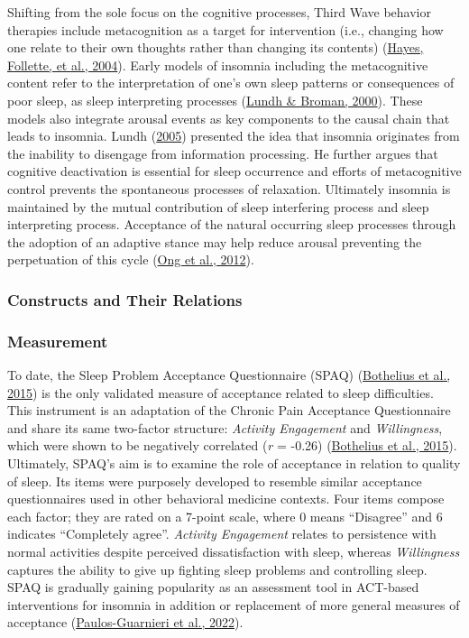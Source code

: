 \documentclass[
  ,doc,11pt, twoside,floatsintext]{apa6}
\begin{document}
Shifting from the sole focus on the cognitive processes, Third Wave behavior therapies include metacognition as a target for intervention (i.e., changing how one relate to their own thoughts rather than changing its contents) (\protect\hyperlink{ref-hayes2004mindfulness}{Hayes, Follette, et al., 2004}). Early models of insomnia including the metacognitive content refer to the interpretation of one's own sleep patterns or consequences of poor sleep, as sleep interpreting processes (\protect\hyperlink{ref-lundh2000}{Lundh \& Broman, 2000}). These models also integrate arousal events as key components to the causal chain that leads to insomnia. Lundh (\protect\hyperlink{ref-lundh2005}{2005}) presented the idea that insomnia originates from the inability to disengage from information processing. He further argues that cognitive deactivation is essential for sleep occurrence and efforts of metacognitive control prevents the spontaneous processes of relaxation. Ultimately insomnia is maintained by the mutual contribution of sleep interfering process and sleep interpreting process. Acceptance of the natural occurring sleep processes through the adoption of an adaptive stance may help reduce arousal preventing the perpetuation of this cycle (\protect\hyperlink{ref-ong2012}{Ong et al., 2012}).

\hypertarget{constructs-and-their-relations-1}{%
\subsubsection{Constructs and Their Relations}\label{constructs-and-their-relations-1}}

\hypertarget{measurement-1}{%
\subsubsection{Measurement}\label{measurement-1}}

To date, the Sleep Problem Acceptance Questionnaire (SPAQ) (\protect\hyperlink{ref-bothelius2015}{Bothelius et al., 2015}) is the only validated measure of acceptance related to sleep difficulties. This instrument is an adaptation of the Chronic Pain Acceptance Questionnaire and share its same two-factor structure: \emph{Activity Engagement} and \emph{Willingness}, which were shown to be negatively correlated (\emph{r} = -0.26) (\protect\hyperlink{ref-bothelius2015}{Bothelius et al., 2015}). Ultimately, SPAQ's aim is to examine the role of acceptance in relation to quality of sleep. Its items were purposely developed to resemble similar acceptance questionnaires used in other behavioral medicine contexts. Four items compose each factor; they are rated on a 7-point scale, where 0 means ``Disagree'' and 6 indicates ``Completely agree''. \emph{Activity Engagement} relates to persistence with normal activities despite perceived dissatisfaction with sleep, whereas \emph{Willingness} captures the ability to give up fighting sleep problems and controlling sleep. SPAQ is gradually gaining popularity as an assessment tool in ACT-based interventions for insomnia in addition or replacement of more general measures of acceptance (\protect\hyperlink{ref-paulos-guarnieri2022}{Paulos-Guarnieri et al., 2022}).
\end{document}
